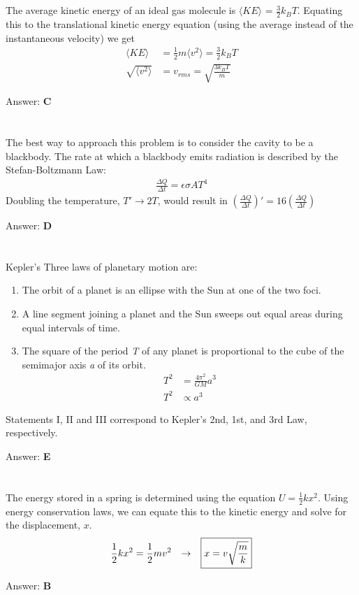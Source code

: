 \documentclass[12pt]{article}
\newcommand{\Answer}[1]{Answer: \textbf{#1}}
\newcommand{\Problem}[3]{
    \setcounter{section}{#1}
    \addtocounter{section}{-1}
    \section{}
    #3\par\par
    \Answer{#2}
}
\begin{document}
\Problem{7}{C}{
The average kinetic energy of an ideal gas molecule is $\langle{KE}\rangle$ = $\frac{3}{2} k_B T$. Equating this to the translational kinetic energy equation (using the average instead of the instantaneous velocity) we get
\begin{align}
\langle{KE}\rangle &= \frac{1}{2}m \langle{v^2}\rangle= \frac{3}{2} k_B T\\
\sqrt{\langle{v^2}\rangle} &= v_{rms} = \boxed{\sqrt{\frac{3 k_B T}{m}}}
\end{align}
}

\Problem{8}{D}{
The best way to approach this problem is to consider the cavity to be a blackbody. The rate at which a blackbody emits radiation is described by the Stefan-Boltzmann Law:
\begin{gather}
\frac{\Delta Q}{\Delta t} = \epsilon \sigma A T^4
\end{gather}
Doubling the temperature, \textit{$T' \rightarrow 2T$}, would result in $\left(\frac{\Delta Q}{\Delta t}\right)' = 16\left(\frac{\Delta Q}{\Delta t}\right)$
}

\Problem{9}{E}{
Kepler's Three laws of planetary motion are:
\begin{enumerate}
\item The orbit of a planet is an ellipse with the Sun at one of the two foci.
\item A line segment joining a planet and the Sun sweeps out equal areas during equal intervals of time.
\item The square of the period \textit{T} of any planet is proportional to the cube of the semimajor axis \textit{a} of its orbit.
\begin{align}
T^2 &= \frac{4\pi^2}{GM}a^3\\
T^2 &\propto a^3
\end{align}
\end{enumerate}
Statements I, II and III correspond to Kepler's 2nd, 1st, and 3rd Law, respectively.
}

\Problem{10}{B}{The energy stored in a spring is determined using the equation $U = \frac{1}{2} k x^2$. Using energy conservation laws, we can equate this to the kinetic energy and solve for the displacement, $x$.
\begin{align}
\frac{1}{2} k x^2 =   \frac{1}{2} m v^2 \hspace{.1in} \rightarrow \hspace{.1in}
\boxed{x=v{\sqrt\frac{m}{k}}}
\end{align}
}
\end{document}
